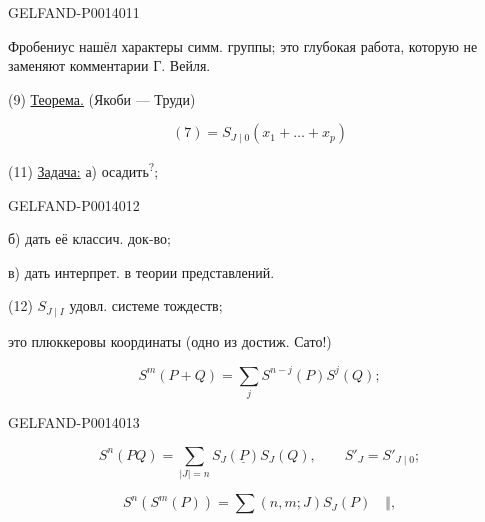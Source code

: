 \begin{GelfandAdjacentEvidence}{GELFAND-P001401}{1}

Фробениус нашёл характеры симм. группы; это глубокая работа, которую не заменяют комментарии Г. Вейля.

(9) \uline{Теорема.} (Якоби — Труди)

\begin{equation*}
(7)=S_{J\mid 0}(x_1+\ldots+x_p) \tag{10}
\end{equation*}

(11) \uline{Задача:} а)
осадить\textsuperscript{?};

\end{GelfandAdjacentEvidence}
\begin{GelfandAdjacentEvidence}{GELFAND-P001401}{2}



б) дать её классич. док-во;

в) дать интерпрет. в теории представлений.

(12) \(S_{J\mid I}\) удовл. системе тождеств;

это плюккеровы координаты (одно из достиж. Сато!)

\begin{equation*}
S^m(P+Q)=\sum_j S^{n-j}(P)S^j(Q); \tag{13}
\end{equation*}
\end{GelfandAdjacentEvidence}
\begin{GelfandAdjacentEvidence}{GELFAND-P001401}{3}


\begin{equation*}
S^n(PQ)=\sum_{\lvert J\rvert=n}S_J(\underline{P})S_J(Q),\qquad
S'_J=S'_{J\mid 0}; \tag{14}
\end{equation*}

\begin{equation*}
S^n(S^m(P))=\sum (n,m;J)S_J(P)\quad\Vert, \tag{15}
\end{equation*}
\end{GelfandAdjacentEvidence}
